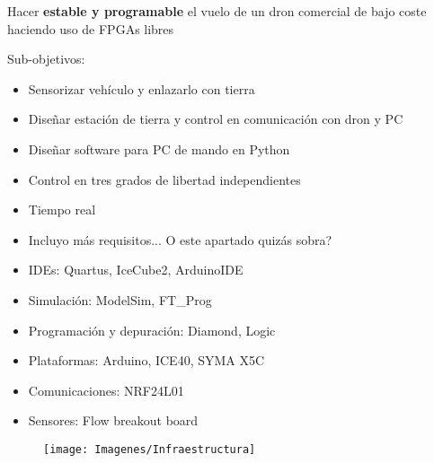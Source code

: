 \documentclass[a4,landscpae]{seminar}
\begin{document}
\begin{hslide}
Hacer \textbf{estable y programable} el vuelo de un dron comercial de
bajo coste haciendo uso de FPGAs libres

Sub-objetivos:
	\begin{itemize}
		\item Sensorizar veh\'iculo y enlazarlo con tierra
		\item Dise\~nar estaci\'on de tierra y control en comunicaci\'on con dron y PC
		\item Dise\~nar software para PC de mando en Python
	\end{itemize}
\end{hslide}
\begin{hslide}
	\begin{itemize}
		\item Control en tres grados de libertad independientes
		\item Tiempo real
		\item Incluyo m\'as requisitos... O este apartado quiz\'as sobra?
	\end{itemize}
\end{hslide}



\begin{hslide}
\begin{minipage}{6.5cm}
	\begin{itemize}
		\item IDEs: Quartus, IceCube2, ArduinoIDE
		\item Simulaci\'on: ModelSim, FT\_Prog
		\item Programaci\'on y depuraci\'on: Diamond, Logic
	\end{itemize}
	\begin{itemize}
		\item Plataformas: Arduino, ICE40, SYMA X5C
		\item Comunicaciones: NRF24L01
		\item Sensores: Flow breakout board

	\end{itemize}
\end{minipage} \hfill
\begin{minipage}{4cm}
	\begin{figure}
		\texttt{[image: Imagenes/Infraestructura]}
	\end{figure}
\end{minipage} \hfill
\end{hslide}
\end{document}
